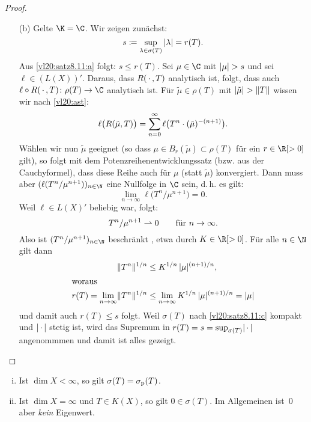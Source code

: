 \begin{proof}
\begin{enumerate}[(a)]
        \item[(b)]
            Gelte $\K=\C$. Wir zeigen zunächst:
            \[ %
                s \defeq \sup_{\lambda\in\sigma(T)}\,\abs\lambda = r(T)
            . \]
            Aus \ref{vl20:satz8.11:a} folgt: $s \leq r(T)$. 
            Sei $\mu\in\C$ mit $\abs\mu > s$ und sei $\ell\in (L(X))'$.
            Daraus, dass $R(\scdot,T)$ analytisch ist, folgt, dass auch
            $\ell\circ R(\scdot,T)\colon \rho(T)\to\C$ analytisch ist. Für
            $\tilde\mu\in\rho(T)$ mit $\abs{\tilde\mu} > \norm{T}$ wissen wir nach
            \eqref{vl20:ast}:
            \[ \ell\bigl(R(\tilde\mu,T)\bigr)
                = \nsum[0]^\infty \ell\bigl(T^n \cdot (\tilde\mu)^{-(n+1)}\bigr)
            . \]
            Wählen wir nun $\tilde\mu$ geeignet (so dass $\mu\in B_r(\tilde\mu)
            \subset\rho(T)$ für ein $r\in\R[>0]$ gilt), so folgt mit dem
            Potenzreihenentwicklungssatz (bzw. aus der Cauchyformel), dass diese
            Reihe auch für $\mu$ (statt $\tilde\mu$) konvergiert. Dann muss aber
            $(\ell(T^n / \mu^{n+1}))_{n\in\N}$ eine Nullfolge in $\C$ sein,
            d.\,h. es gilt:
            \[ \lim_{n\to\infty} \ell\bigl(T^n / \mu^{n+1}\bigr) = 0  . \]
            Weil $\ell\in L(X)'$ beliebig war, folgt:
            \[ T^n / \mu^{n+1} \weakto 0 \fuer n\to\infty  . \]
            Also ist $(T^n/\mu^{n+1})_{n\in\N}$ beschränkt
            , etwa durch $K\in\R[>0]$.
            Für alle $n\in\N$ gilt dann
            \begin{align*}
                \norm{T^n}^{1/n} &\leq K^{1/n} \, \abs{\mu}^{(n+1)/n}  , 
                \\ \shortintertext{woraus}
                r(T) = \lim_{n\to\infty} \norm{T^n}^{1/n} 
                &\leq \lim_{n\to\infty} K^{1/n} \, \abs{\mu}^{(n+1)/n} =\abs{\mu}
            \end{align*}
            und damit auch $r(T) \leq s$ folgt.
            Weil $\sigma(T)$ nach \ref{vl20:satz8.11:c} kompakt und
            $\abs{\scdot}$ stetig ist, wird das Supremum in 
            $r(T) = s = \sup_{\sigma(T)} \abs\scdot$ angenommmen und damit ist alles
            gezeigt.
    \end{enumerate}
\end{proof}

\begin{thBemerkungen}\hfill
    \begin{enumerate}[(i)]
        \item
            Ist $\dim X < \infty$, so gilt $\sigma(T) = \sigmap(T)$.
            
        \item
            Ist $\dim X = \infty$ und $T\in K(X)$, so gilt $0\in\sigma(T)$.
            Im Allgemeinen ist~$0$ aber \emph{kein} Eigenwert.
    \end{enumerate}
\end{thBemerkungen}

